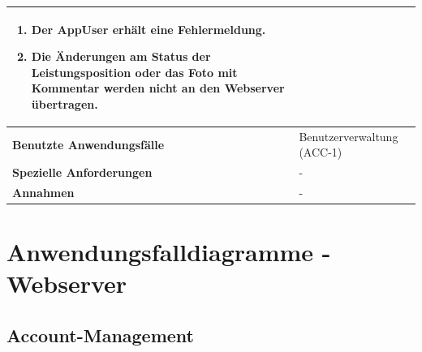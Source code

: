 \begin{longtable}[c]{|p{4cm}|p{10cm}|}
\begin{enumerate}
        \item Der AppUser erh\"alt eine Fehlermeldung.
        \item Die \"Anderungen am Status der Leistungsposition oder das Foto mit Kommentar werden nicht an den Webserver \"ubertragen.
    \end{enumerate}                                                                                                                                                                                                                                                                                                                                     \\ \hline
    \textbf{Benutzte Anwendungsfälle}   & Benutzerverwaltung (ACC-1)                                                                                                                                                                                                                                                                                               \\ \hline
    \textbf{Spezielle Anforderungen}    & -                                                                                                                                                                                                                                                                                                                        \\ \hline
    \textbf{Annahmen}                   & -                                                                                                                                                                                                                                                                                                                        \\ \hline
\end{longtable}

\clearpage

\section{Anwendungsfalldiagramme - Webserver}

\subsection{Account-Management}

